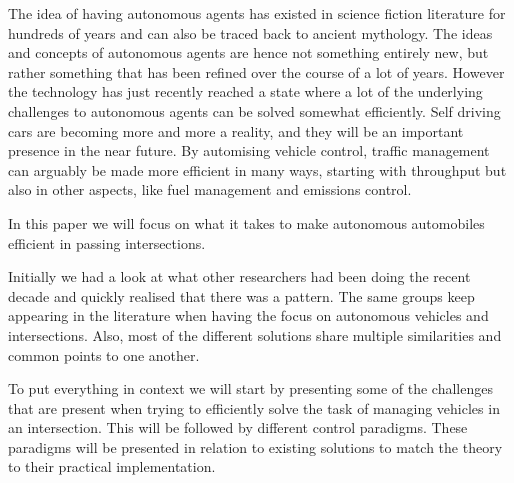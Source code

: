 
The idea of having autonomous agents has existed in science fiction literature for hundreds of years and can also be traced back to ancient mythology.
The ideas and concepts of autonomous agents are hence not something entirely new, but rather something that has been refined over the course of a lot of years.
However the technology has just recently reached a state where a lot of the underlying challenges to autonomous agents can be solved somewhat efficiently.
Self driving cars are becoming more and more a reality, and they will be an important presence in the near future.
By automising vehicle control, traffic management can arguably be made more efficient in many ways, starting with throughput but also in other aspects, like fuel management and emissions control. 

In this paper we will focus on what it takes to make autonomous automobiles efficient in passing intersections.

Initially we had a look at what other researchers had been doing the recent decade and quickly realised that there was a pattern. 
The same groups keep appearing in the literature when having the focus on autonomous vehicles and intersections.
Also, most of the different solutions share multiple similarities and common points to one another.

To put everything in context we will start by presenting some of the challenges that are present when trying to efficiently solve the task of managing vehicles in an intersection.
This will be followed by different control paradigms.
These paradigms will be presented in relation to existing solutions to match the theory to their practical implementation.
